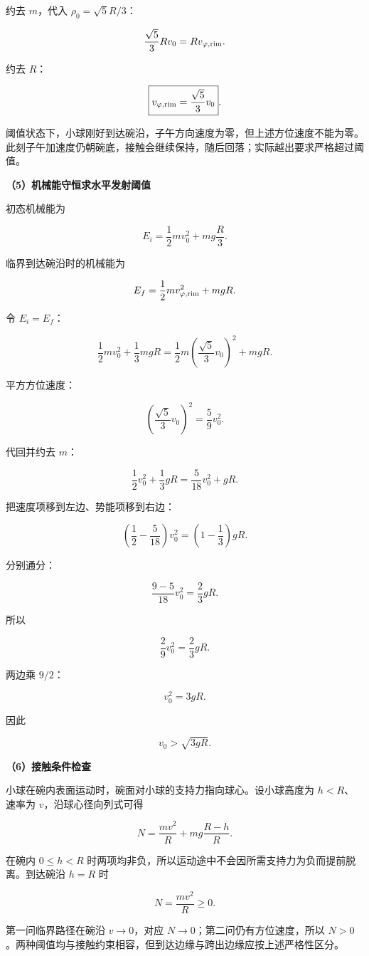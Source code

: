 \documentclass[12pt,a4paper,UTF8]{ctexart}
\begin{document}
约去 \(m\)，代入 \(\rho_0=\sqrt5R/3\)：

\[
\frac{\sqrt5}{3}Rv_0
=Rv_{\varphi,\rm rim}.
\]

约去 \(R\)：

\[
\boxed{
v_{\varphi,\rm rim}=\frac{\sqrt5}{3}v_0
}.
\]

阈值状态下，小球刚好到达碗沿，子午方向速度为零，但上述方位速度不能为零。此刻子午加速度仍朝碗底，接触会继续保持，随后回落；实际越出要求严格超过阈值。

\textbf{（5）机械能守恒求水平发射阈值}

初态机械能为

\[
E_i=\frac12mv_0^2+mg\frac R3.
\]

临界到达碗沿时的机械能为

\[
E_f=\frac12m v_{\varphi,\rm rim}^2+mgR.
\]

令 \(E_i=E_f\)：

\[
\frac12mv_0^2+\frac13mgR
=\frac12m\left(\frac{\sqrt5}{3}v_0\right)^2+mgR.
\]

平方方位速度：

\[
\left(\frac{\sqrt5}{3}v_0\right)^2
=\frac59v_0^2.
\]

代回并约去 \(m\)：

\[
\frac12v_0^2+\frac13gR
=\frac{5}{18}v_0^2+gR.
\]

把速度项移到左边、势能项移到右边：

\[
\left(\frac12-\frac5{18}\right)v_0^2
=\left(1-\frac13\right)gR.
\]

分别通分：

\[
\frac{9-5}{18}v_0^2=\frac23gR.
\]

所以

\[
\frac29v_0^2=\frac23gR.
\]

两边乘 \(9/2\)：

\[v_0^2=3gR.\]

因此

\[
\boxed{v_0>\sqrt{3gR}}.
\]

\textbf{（6）接触条件检查}

小球在碗内表面运动时，碗面对小球的支持力指向球心。设小球高度为
\(h<R\)、速率为 \(v\)，沿球心径向列式可得

\[
N=\frac{mv^2}{R}+mg\frac{R-h}{R}.
\]

在碗内 \(0\le h<R\)
时两项均非负，所以运动途中不会因所需支持力为负而提前脱离。到达碗沿
\(h=R\) 时

\[N=\frac{mv^2}{R}\ge0.\]

第一问临界路径在碗沿 \(v\to0\)，对应 \(N\to0\)；第二问仍有方位速度，所以
\(N>0\)。两种阈值均与接触约束相容，但到达边缘与跨出边缘应按上述严格性区分。
\end{document}
